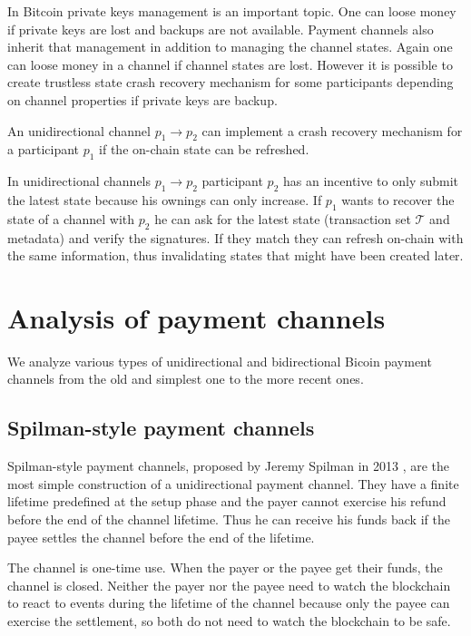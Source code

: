 \documentclass{llncs}
\begin{document}
In Bitcoin private keys management is an important topic. One can loose money if private keys are lost and backups are not available. Payment channels also inherit that management in addition to managing the channel states. Again one can loose money in a channel if channel states are lost. However it is possible to create trustless state crash recovery mechanism for some participants depending on channel properties if private keys are backup.

\begin{corollary} An unidirectional channel $p_1 \rightarrow p_2$ can implement a crash recovery mechanism for a participant $p_1$ if the on-chain state can be refreshed.
\end{corollary}

In unidirectional channels $p_1 \rightarrow p_2$ participant $p_2$ has an incentive to only submit the latest state because his ownings can only increase. If $p_1$ wants to recover the state of a channel with $p_2$ he can ask for the latest state (transaction set $\mathcal{T}$ and metadata) and verify the signatures. If they match they can refresh on-chain with the same information, thus invalidating states that might have been created later.

\section{Analysis of payment channels}

We analyze various types of unidirectional and bidirectional Bicoin payment channels from the old and simplest one to the more recent ones.

\subsection{Spilman-style payment channels}

Spilman-style payment channels, proposed by Jeremy Spilman in 2013 \cite{SpilmanStyle}, are the most simple construction of a unidirectional payment channel. They have a finite lifetime predefined at the setup phase and the payer cannot exercise his refund before the end of the channel lifetime. Thus he can receive his funds back if the payee settles the channel before the end of the lifetime.

The channel is one-time use. When the payer or the payee get their funds, the channel is closed. Neither the payer nor the payee need to watch the blockchain to react to events during the lifetime of the channel because only the payee can exercise the settlement, so both do not need to watch the blockchain to be safe.
\end{document}
